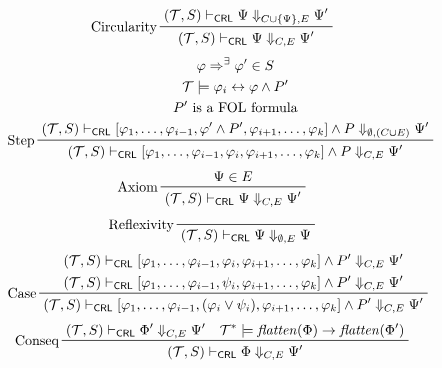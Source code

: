\begin{figure}
    \centering
    \begin{align*}
      & \prftree[l]{Circularity}
        { (\mathcal{T}, S) \provesCRL \Psi \Downarrow_{C \cup \{ \Psi \} , E} \Psi^\prime}
        { (\mathcal{T}, S) \provesCRL \Psi \Downarrow_{C, E} \Psi^\prime}
    \end{align*}
    \begin{align*}
      & \prftree[l]{Step}
      { \prfStackPremises
         {\varphi \Rightarrow^\exists \varphi^\prime \in S}
         {\mathcal{T} \modelsML \varphi_i \leftrightarrow \varphi \land P^\prime}
         {P^\prime \mbox{ is a FOL formula}}
         {  (\mathcal{T}, S) \provesCRL [\varphi_1, \ldots, \varphi_{i-1}, \varphi^\prime \land P^\prime, \varphi_{i+1}, \ldots, \varphi_k]
            \land P
            \Downarrow_{\emptyset, (C \cup E)} \Psi^\prime
        }
      }
      {(\mathcal{T}, S) \provesCRL [\varphi_1, \ldots, \varphi_{i-1}, \varphi_i, \varphi_{i+1}, \ldots, \varphi_k] \land P \Downarrow_{C, E} \Psi^\prime}
    \end{align*}
    \begin{align*}
      & \prftree[l]{Axiom}{\Psi \in E}{(\mathcal{T}, S) \provesCRL \Psi \Downarrow_{C,E} \Psi^\prime}
    \end{align*}
    \begin{align*}
    & \prftree[l]{Reflexivity}{(\mathcal{T}, S) \provesCRL \Psi \Downarrow_{\emptyset,E} \Psi}
    \end{align*}
    \begin{align*}
      & \prftree[l]{Case}
      { \prfStackPremises
        {(\mathcal{T}, S) \provesCRL [\varphi_1, \ldots, \varphi_{i-1}, \varphi_i, \varphi_{i+1}, \ldots, \varphi_k] \land P^\prime \Downarrow_{C, E} \Psi^\prime }
        {(\mathcal{T}, S) \provesCRL [\varphi_1, \ldots, \varphi_{i-1}, \psi_i, \varphi_{i+1}, \ldots, \varphi_k] \land P^\prime \Downarrow_{C, E} \Psi^\prime }
      }
      {(\mathcal{T}, S) \provesCRL [\varphi_1, \ldots, \varphi_{i-1}, (\varphi_i \lor \psi_i), \varphi_{i+1}, \ldots, \varphi_k] \land P^\prime \Downarrow_{C, E} \Psi^\prime}
    \end{align*}
    \begin{align*}
      & \prftree[l]{Conseq}
        { %
          { (\mathcal{T}, S) \provesCRL \Phi^\prime \Downarrow_{C, E} \Psi^\prime} \quad
          { \mathcal{T}^* \modelsML \mathit{flatten}(\Phi) \rightarrow \mathit{flatten}(\Phi^\prime) }
        }
        { (\mathcal{T}, S) \provesCRL \Phi \Downarrow_{C, E} \Psi^\prime}

\end{align*}
\end{figure}
